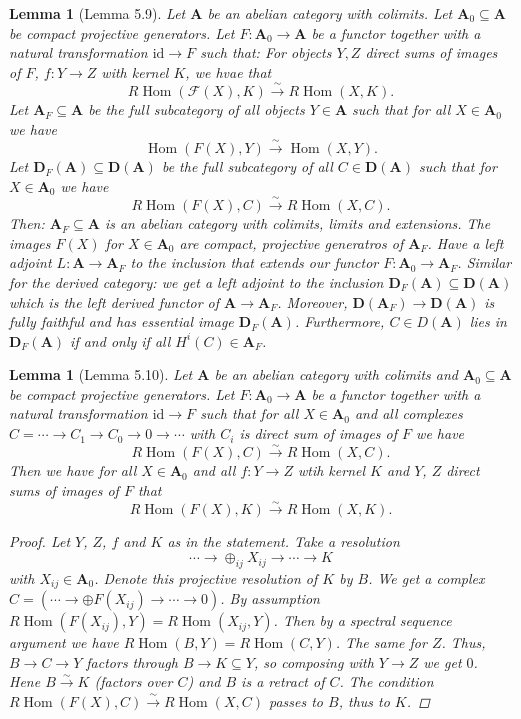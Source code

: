 \documentclass[12pt]{article}
\theoremstyle{darkgreentheorem}
\newtheorem{lm}[thm]{Lemma}
\theoremstyle{darkbluedefinition}
\theoremstyle{darkredexample}
\theoremstyle{remark}
\newcommand{\1}{\mathbbm{1}}
\newcommand{\A}{\mathbf{A}}
\newcommand{\D}{\mathbf{D}}
\newcommand{\F}{\mathcal{F}}
\DeclareMathOperator{\Hom}{Hom}
\newcommand{\op}{\oplus}
\newcommand{\id}{\mathrm{id}}
\newcommand{\sub}{\subseteq}
\begin{document}
\begin{lm}[Lemma 5.9]
    Let $\A$ be an abelian category with colimits.
    Let $\A_{0}\sub \A$ be compact projective generators.
    Let $F\colon \A_{0}\to \A$ be a functor together with a natural transformation $\id\to F$ such that:
    For objects $Y,Z$ direct sums of images of $F$, $f\colon Y\to Z$ with kernel $K$, we hvae that
    \[ R\Hom(\F(X),K)\xrightarrow{\sim} R\Hom(X,K).\]
    Let $\A_{F}\sub \A$ be the full subcategory of all objects $Y\in \A$ such that for all $X\in \A_{0}$ we have
    \[ \Hom(F(X),Y)\xrightarrow{\sim}\Hom(X,Y).\]
    Let $\D_{F}(\A)\sub \D(\A)$ be the full subcategory of all $C\in \D(\A)$ such that for $X\in \A_{0}$ we have
    \[ R\Hom(F(X),C)\xrightarrow{\sim}R\Hom(X,C).\]
    Then: $\A_{F}\sub \A$ is an abelian category with colimits, limits and extensions.
    The images $F(X)$ for $X\in \A_{0}$ are compact, projective generatros of $\A_{F}$.
    Have a left adjoint $L\colon \A\to \A_{F}$ to the inclusion that extends our functor $F\colon \A_{0}\to \A_{F}$.
    Similar for the derived category: we get a left adjoint to the inclusion $\D_{F}(\A)\sub \D(\A)$ which is the left derived functor of $\A\to \A_{F}$.
    Moreover, $\D(\A_{F})\to \D(\A)$ is fully faithful and has essential image $\D_{F}(\A)$.
    Furthermore, $C\in D(\A)$ lies in $\D_{F}(\A)$ if and only if all $H^{i}(C)\in \A_{F}$.
\end{lm}

\begin{lm}[Lemma 5.10]
    Let $\A$ be an abelian category with colimits and $\A_{0}\sub \A$ be compact projective generators.
    Let $F\colon \A_{0}\to \A$ be a functor together with a natural transformation $\id\to F$ such that for all $X\in \A_{0}$ and all complexes $C=\cdots\to C_{1}\to C_{0}\to 0\to \cdots $ with $C_{i}$ is direct sum of images of $F$ we have
    \[ R\Hom(F(X),C)\xrightarrow{\sim}R\Hom(X,C).\]
    Then we have for all $X\in \A_{0}$ and all $f\colon Y\to Z$ wtih kernel $K$ and $Y$, $Z$ direct sums of images of $F$ that
    \[ R\Hom(F(X),K)\xrightarrow{\sim}R\Hom(X,K).\]
    \begin{proof}
	Let $Y$, $Z$, $f$ and $K$ as in the statement.
	Take a resolution
	\[ \cdots \to \op_{ij}X_{ij}\to \cdots \to K\]
	with $X_{ij}\in \A_{0}$.
	Denote this projective resolution of $K$ by $B$.
	We get a complex $C=(\cdots \to \op F(X_{ij})\to \cdots \to 0)$.
	By assumption $R\Hom(F(X_{ij}),Y)=R\Hom(X_{ij},Y)$.
	Then by a spectral sequence argument we have $R\Hom(B,Y)=R\Hom(C,Y)$.
	The same for $Z$.
	Thus, $B\to C\to Y$ factors through $B\to K\sub Y$, so composing with $Y\to Z$ we get $0$.
	Hene $B\xrightarrow{\sim}K$ (factors over $C$) and $B$ is a retract of $C$.
	The condition $R\Hom(F(X),C)\xrightarrow{\sim}R\Hom(X,C)$ passes to $B$, thus to $K$.
    \end{proof}
\end{lm}
\end{document}
